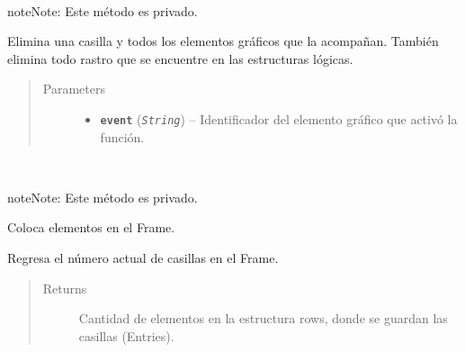 \documentclass[class=report, crop=false]{standalone}
\begin{document}
\begin{fulllineitems}
\begin{fulllineitems}
\end{fulllineitems}

\begin{fulllineitems}

~

\begin{notice}{note}{Note:}
Este método es privado.
\end{notice}

Elimina una casilla y todos los elementos 
gráficos que la acompañan.\break
También elimina todo rastro que se encuentre 
en las estructuras lógicas.

\begin{quote}\begin{description}
\item[{Parameters}] \leavevmode\begin{itemize}
\item \textbf{\texttt{event}} (\emph{\texttt{String}}) -- Identificador del elemento gráfico que activó la función.
\end{itemize}
\end{description}\end{quote}

\end{fulllineitems}

\begin{fulllineitems}

~

\begin{notice}{note}{Note:}
Este método es privado.
\end{notice}

Coloca elementos en el Frame.

\end{fulllineitems}

\begin{fulllineitems}

Regresa el número actual de casillas 
en el Frame.

\begin{quote}\begin{description}
\item[{Returns}] \leavevmode
Cantidad de elementos en la estructura rows, donde se guardan las casillas (Entries).


\end{description}
\end{quote}
\end{fulllineitems}
\end{fulllineitems}
\end{document}
